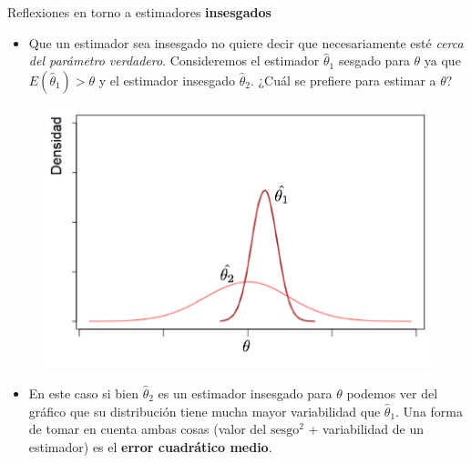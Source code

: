 \documentclass{beamer}
\theoremstyle{definition}
\begin{document}
\begin{frame}{\color{rosee}Reflexiones en torno a estimadores \textbf{insesgados}}\small
  \begin{itemize}
  \item Que un estimador sea insesgado no quiere decir que
    necesariamente esté \textit{cerca del par\'ametro verdadero}. Consideremos el estimador $\widehat{\theta}_1$ sesgado para $\theta$ ya que $E(\widehat{\theta}_1)>\theta$ y el estimador insesgado $\widehat{\theta}_2$. ¿Cuál se prefiere para estimar a $\theta$?
        \end{itemize}
    \begin{figure}
      \centering
    \includegraphics[height=.4\textheight]{slides3/img/biasvariance.png}
  \end{figure}
  \begin{itemize}
    \item En este caso si bien $\widehat{\theta}_2$ es un estimador insesgado para $\theta$ podemos ver del gráfico que su distribución tiene mucha mayor variabilidad que $\widehat{\theta}_1$. Una forma de tomar en cuenta ambas cosas (valor del $\text{sesgo}^2$ + variabilidad de un estimador) es el \textbf{error cuadrático medio}. %
  \end{itemize}
\end{frame}
\end{document}
